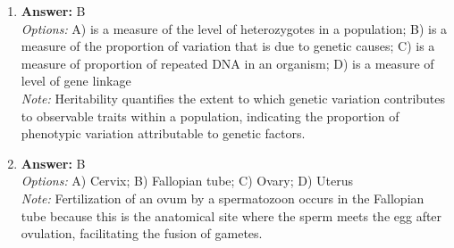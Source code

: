 \documentclass[12pt]{article}
\begin{document}
\begin{enumerate}[label=\arabic*.]
\item \textbf{Answer:} B
\\ \textit{Options:} A) is a measure of the level of heterozygotes in a population; B) is a measure of the proportion of variation that is due to genetic causes; C) is a measure of proportion of repeated DNA in an organism; D) is a measure of level of gene linkage
\\ \textit{Note:} Heritability quantifies the extent to which genetic variation contributes to observable traits within a population, indicating the proportion of phenotypic variation attributable to genetic factors.
\item \textbf{Answer:} B
\\ \textit{Options:} A) Cervix; B) Fallopian tube; C) Ovary; D) Uterus
\\ \textit{Note:} Fertilization of an ovum by a spermatozoon occurs in the Fallopian tube because this is the anatomical site where the sperm meets the egg after ovulation, facilitating the fusion of gametes.
\end{enumerate}
\end{document}
